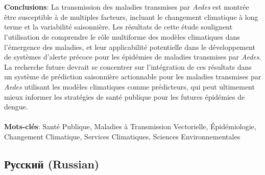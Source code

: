 \documentclass[10pt]{article}
\begin{document}
\\
\\
\textbf{Conclusions}: La transmission des maladies transmises par \textit{Aedes} est montrée être susceptible à de multiples facteurs, incluant le changement climatique à long terme et la variabilité saisonnière. Les résultats de cette étude soulignent l'utilisation de comprendre le rôle multiforme des modèles climatiques dans l'émergence des maladies, et leur applicabilité potentielle dans le développement de systèmes d'alerte précoce pour les épidémies de maladies transmises par \textit{Aedes}. La recherche future devrait se concentrer sur l'intégration de ces résultats dans un système de prédiction saisonnière actionnable pour les maladies transmises par \textit{Aedes} utilisant les modèles climatiques comme prédicteurs, qui peut ultimement mieux informer les stratégies de santé publique pour les futures épidémies de dengue.
\\
\\
\textbf{Mots-clés}: Santé Publique, Maladies à Transmission Vectorielle, Épidémiologie, Changement Climatique, Services Climatiques, Sciences Environnementales

\newpage

\subsection*{Русский (Russian)}
\end{document}
